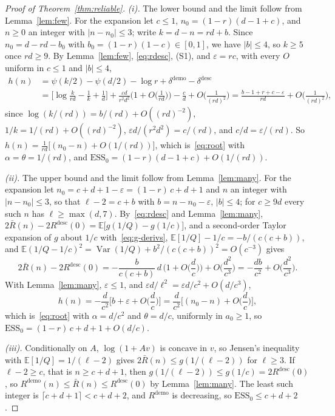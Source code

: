 \documentclass{article}
\newcommand{\ess}{\mathrm{ESS}}
\newcommand{\E}{\mathbb{E}}
\begin{document}
\begin{proof}[Proof of Theorem~\ref{thm:reliable}]
\emph{(i).} The lower bound and the limit follow from Lemma~\ref{lem:few}. For the expansion let $c \le 1$, $n_0 = (1-r)(d-1+c)$, and $n \ge 0$ an integer with $|n - n_0| \le 3$; write $k = d - n = rd + b$. Since $n_0 = d - rd - b_0$ with $b_0 = (1-r)(1-c) \in [0, 1]$, we have $|b| \le 4$, so $k \ge 5$ once $rd \ge 9$. By Lemma~\ref{lem:few}, \eqref{eq:rdesc}, (S1), and $\varepsilon = rc$, with every $O$ uniform in $c \le 1$ and $|b| \le 4$,
\begin{align*}
h(n) &= \psi(k/2) - \psi(d/2) - \log r + \delta^{\mathrm{demo}} - \delta^{\mathrm{desc}} \\
&= \Big[\log\frac{k}{rd} - \frac1k + \frac1d\Big] + \frac{\varepsilon d}{r^2 d^2}\Big(1 + O\Big(\frac{1}{rd}\Big)\Big) - \frac{c}{d} + O\Big(\frac{1}{(rd)^2}\Big)
 = \frac{b - 1 + r + c - \varepsilon}{rd} + O\Big(\frac{1}{(rd)^2}\Big),
\end{align*}
since $\log(k/(rd)) = b/(rd) + O((rd)^{-2})$, $1/k = 1/(rd) + O((rd)^{-2})$, $\varepsilon d / (r^2 d^2) = c/(rd)$, and $c/d = \varepsilon/(rd)$. So $h(n) = \frac{1}{rd}\big[(n_0 - n) + O(1/(rd))\big]$, which is~\eqref{eq:root} with $\alpha = \theta = 1/(rd)$, and $\ess_0 = (1-r)(d-1+c) + O(1/(rd))$.

\emph{(ii).} The upper bound and the limit follow from Lemma~\ref{lem:many}. For the expansion let $n_0 = c + d + 1 - \varepsilon = (1-r)\,c + d + 1$ and $n$ an integer with $|n - n_0| \le 3$, so that $\ell - 2 = c + b$ with $b = n - n_0 - \varepsilon$, $|b| \le 4$; for $c \ge 9d$ every such $n$ has $\ell \ge \max(d, 7)$. By~\eqref{eq:rdesc} and Lemma~\ref{lem:many}, $2\bar R(n) - 2R^{\mathrm{desc}}(0) = \E\big[g(1/Q) - g(1/c)\big]$, and a second-order Taylor expansion of $g$ about $1/c$ with~\eqref{eq:g-derivs}, $\E[1/Q] - 1/c = -b/(c(c+b))$, and $\E(1/Q - 1/c)^2 = \operatorname{Var}(1/Q) + b^2/(c(c+b))^2 = O(c^{-3})$ gives
\[
2\bar R(n) - 2R^{\mathrm{desc}}(0) = -\frac{b}{c(c+b)}\,d\,\Big(1 + O\Big(\frac dc\Big)\Big) + O\Big(\frac{d^2}{c^3}\Big) = -\frac{db}{c^2} + O\Big(\frac{d^2}{c^3}\Big).
\]
With Lemma~\ref{lem:many}, $\varepsilon \le 1$, and $\varepsilon d/\ell^2 = \varepsilon d/c^2 + O(d/c^3)$,
\[
h(n) = -\frac{d}{c^2}\Big[b + \varepsilon + O\Big(\frac{d}{c}\Big)\Big] = \frac{d}{c^2}\Big[(n_0 - n) + O\Big(\frac{d}{c}\Big)\Big],
\]
which is~\eqref{eq:root} with $\alpha = d/c^2$ and $\theta = d/c$, uniformly in $a_0 \ge 1$, so $\ess_0 = (1-r)\,c + d + 1 + O(d/c)$.

\emph{(iii).} Conditionally on $A$, $\log(1 + Av)$ is concave in $v$, so Jensen's inequality with $\E[1/Q] = 1/(\ell-2)$ gives $2\bar R(n) \le g(1/(\ell-2))$ for $\ell \ge 3$. If $\ell - 2 \ge c$, that is $n \ge c + d + 1$, then $g(1/(\ell-2)) \le g(1/c) = 2R^{\mathrm{desc}}(0)$, so $R^{\mathrm{demo}}(n) \le \bar R(n) \le R^{\mathrm{desc}}(0)$ by Lemma~\ref{lem:many}. The least such integer is $\lceil c + d + 1 \rceil < c + d + 2$, and $R^{\mathrm{demo}}$ is decreasing, so $\ess_0 \le c + d + 2$.
\end{proof}
\end{document}
